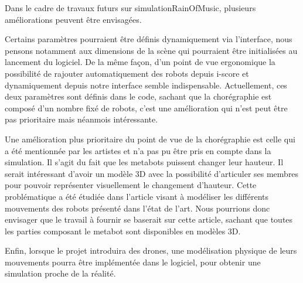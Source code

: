Dans le cadre de travaux futurs sur simulationRainOfMusic, plusieurs améliorations peuvent être envisagées.

Certains paramètres pourraient être définis dynamiquement via l'interface, nous pensons notamment aux dimensions de la scène qui pourraient être initialisées au lancement du logiciel. De la même façon, d'un point de vue ergonomique la possibilité de rajouter automatiquement des robots depuis i-score et dynamiquement depuis notre interface semble indispensable. Actuellement, ces deux paramètres sont définis dans le code, sachant que la chorégraphie est composé d'un nombre fixé de robots, c'est une amélioration qui n'est peut être pas prioritaire mais néanmois intéressante.

Une amélioration plus prioritaire du point de vue de la chorégraphie est celle qui a été mentionnée par les artistes et n'a pas pu être pris en compte dans la simulation. Il s'agit du fait que les metabots puissent changer leur hauteur. Il serait intéressant d'avoir un modèle 3D avec la possibilité d'articuler ses membres pour pouvoir représenter visuellement le changement d'hauteur. Cette problématique a été étudiée dans l'article visant à modéliser les différents mouvements des robots \cite{robotArt} présenté dans l'état de l'art. Nous pourrions donc envisager que le travail à fournir se baserait sur cette article, sachant que toutes les parties composant le metabot sont disponibles en modèles 3D.

Enfin, lorsque le projet introduira des drones, une modélisation physique de leurs mouvements pourra être implémentée dans le logiciel, pour obtenir une simulation proche de la réalité.

